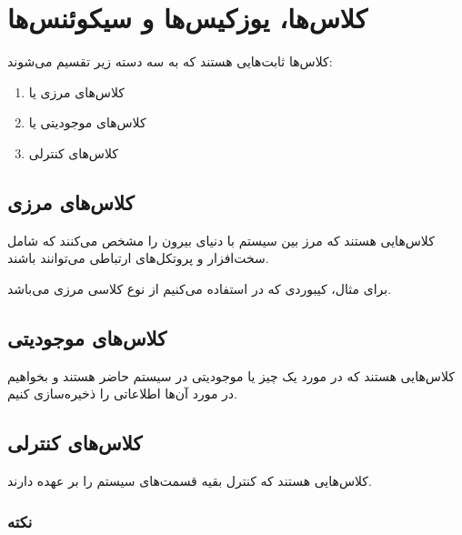 \section{کلاس‌ها، یوزکیس‌ها و سیکوئنس‌ها}

کلاس‌ها ثابت‌هایی هستند که به سه دسته زیر تقسیم می‌شوند:

\begin{enumerate}
    \item کلاس‌های مرزی یا 
    \item کلاس‌های موجودیتی یا 
    \item کلاس‌های کنترلی 
\end{enumerate}

\subsection{کلاس‌های مرزی}

کلاس‌هایی هستند که مرز بین سیستم با دنیای بیرون را مشخص می‌کنند که شامل
سخت‌افزار و پروتکل‌های ارتباطی می‌توانند باشند.

برای مثال، کیبوردی که در  استفاده می‌کنیم از نوع کلاسی مرزی می‌باشد.

\subsection{کلاس‌های موجودیتی}

کلاس‌هایی هستند که در مورد یک چیز یا موجودیتی در سیستم حاضر هستند و بخواهیم در
مورد آن‌ها اطلاعاتی را ذخیره‌سازی کنیم.

\subsection{کلاس‌های کنترلی}

کلاس‌هایی هستند که کنترل بقیه قسمت‌های سیستم را بر عهده دارند.

\subsubsection*{نکته‌}

